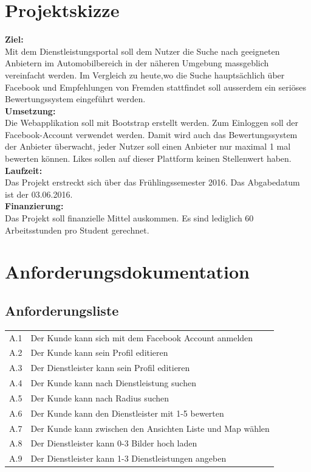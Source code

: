 \documentclass[11pt,a4paper]{scrreprt}
\begin{document}
\chapter{Projektskizze}
\textbf{Ziel:}\\
Mit dem Dienstleistungsportal soll dem Nutzer die Suche nach geeigneten Anbietern im Automobilbereich in der näheren Umgebung massgeblich vereinfacht werden. Im Vergleich zu heute,wo die Suche hauptsächlich über Facebook und Empfehlungen von Fremden stattfindet soll ausserdem ein seriöses Bewertungssystem eingeführt werden.\\

\noindent
\textbf{Umsetzung:}\\
Die Webapplikation soll mit Bootstrap erstellt werden. Zum Einloggen soll der Facebook-Account verwendet werden. Damit wird auch das Bewertungssystem der Anbieter überwacht, jeder Nutzer soll einen Anbieter nur maximal 1 mal bewerten können. Likes sollen auf dieser Plattform keinen Stellenwert haben.\\

\noindent
\textbf{Laufzeit:}\\
Das Projekt erstreckt sich über das Frühlingssemester 2016. Das Abgabedatum ist der 03.06.2016.\\

\noindent
\textbf{Finanzierung:}\\
Das Projekt soll finanzielle Mittel auskommen. Es sind lediglich 60 Arbeitsstunden pro Student gerechnet.

\chapter{Anforderungsdokumentation}
\section{Anforderungsliste}
\begin{tabular}{ll}
    A.1 & Der Kunde kann sich mit dem Facebook Account anmelden\\
    A.2 & Der Kunde kann sein Profil editieren\\
    A.3 & Der Dienstleister kann sein Profil editieren\\
    A.4 & Der Kunde kann nach Dienstleistung suchen\\
    A.5 & Der Kunde kann nach Radius suchen\\
    A.6 & Der Kunde kann den Dienstleister mit 1-5 bewerten\\
    A.7 & Der Kunde kann zwischen den Ansichten Liste und Map wählen\\
    A.8 & Der Dienstleister kann 0-3 Bilder hoch laden\\
    A.9 & Der Dienstleister kann 1-3 Dienstleistungen angeben\\

\end{tabular}\\
\end{document}
